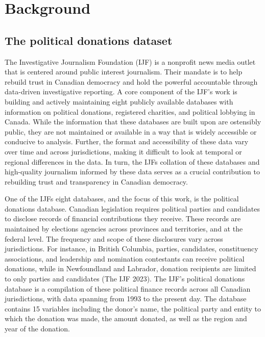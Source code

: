 \documentclass[
  letterpaper,
  DIV=11,
  numbers=noendperiod]{scrartcl}
\begin{document}
\hypertarget{sec-background}{%
\section{Background}\label{sec-background}}

\hypertarget{the-political-donations-dataset}{%
\subsection{The political donations
dataset}\label{the-political-donations-dataset}}

The Investigative Journalism Foundation (IJF) is a nonprofit news media
outlet that is centered around public interest journalism. Their mandate
is to help rebuild trust in Canadian democracy and hold the powerful
accountable through data-driven investigative reporting. A core
component of the IJF's work is building and actively maintaining eight
publicly available databases with information on political donations,
registered charities, and political lobbying in Canada. While the
information that these databases are built upon are ostensibly public,
they are not maintained or available in a way that is widely accessible
or conducive to analysis. Further, the format and accessibility of these
data vary over time and across jurisdictions, making it difficult to
look at temporal or regional differences in the data. In turn, the IJFs
collation of these databases and high-quality journalism informed by
these data serves as a crucial contribution to rebuilding trust and
transparency in Canadian democracy.

One of the IJFs eight databases, and the focus of this work, is the
political donations database. Canadian legislation requires political
parties and candidates to disclose records of financial contributions
they receive. These records are maintained by elections agencies across
provinces and territories, and at the federal level. The frequency and
scope of these disclosures vary across jurisdictions. For instance, in
British Columbia, parties, candidates, constituency associations, and
leadership and nomination contestants can receive political donations,
while in Newfoundland and Labrador, donation recipients are limited to
only parties and candidates (The IJF 2023). The IJF's political
donations database is a compilation of these political finance records
across all Canadian jurisdictions, with data spanning from 1993 to the
present day. The database contains 15 variables including the donor's
name, the political party and entity to which the donation was made, the
amount donated, as well as the region and year of the donation.
\end{document}
